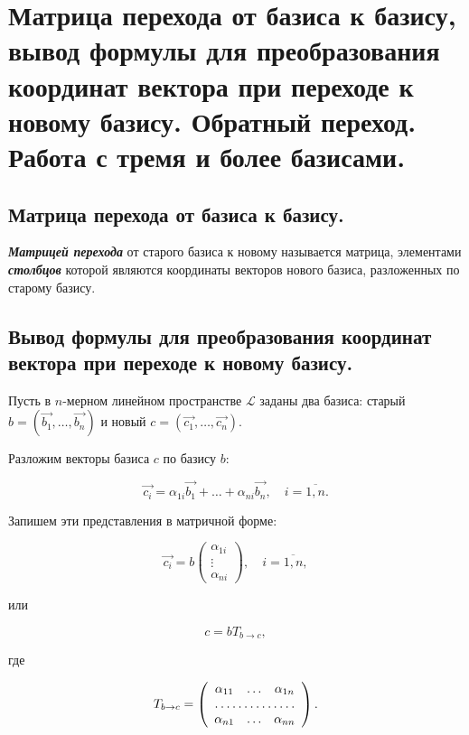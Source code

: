 \section{
    Матрица перехода от базиса к базису, вывод формулы для преобразования координат вектора при переходе к новому базису. Обратный переход. Работа с тремя и более базисами.
}

\subsection{
    Матрица перехода от базиса к базису.
}

\begin{definition}
    \textit{\textbf{Матрицей перехода}} от старого базиса к новому называется матрица, элементами \textit{\textbf{столбцов}} которой являются координаты векторов нового базиса, разложенных по старому базису.
    \label{fig:definition_17_1}
\end{definition}

\subsection{
    Вывод формулы для преобразования координат вектора при переходе к новому базису.
}

Пусть в $n$-мерном линейном пространстве $\mathcal{L}$ заданы два базиса: старый $b = (\vec{b_1}, \ldots, \vec{b_n})$ и новый $c = (\vec{c_1}, \ldots, \vec{c_n})$.

Разложим векторы базиса $c$ по базису $b$:

$$\vec{c_i} = \alpha_{1i}\vec{b_1} + \ldots + \alpha_{ni}\vec{b_n}, \quad i = \overline{1, n}.$$

Запишем эти представления в матричной форме:

$$\vec{c_i} = b \begin{pmatrix} \alpha_{1i} \\ \vdots \\ \alpha_{ni} \end{pmatrix}, \quad  i = \overline{1, n},$$

или

$$c = bT_{b \to c},$$

где

\begin{equation*}
    T_{b \to c} = \left(\begin{array}{ccc}
        \alpha_{11} & \ldots & \alpha_{1n} \\
        \hdotsfor{3} \\
        \alpha_{n1} & \ldots & \alpha_{nn}
    \end{array}\right).
\end{equation*}

